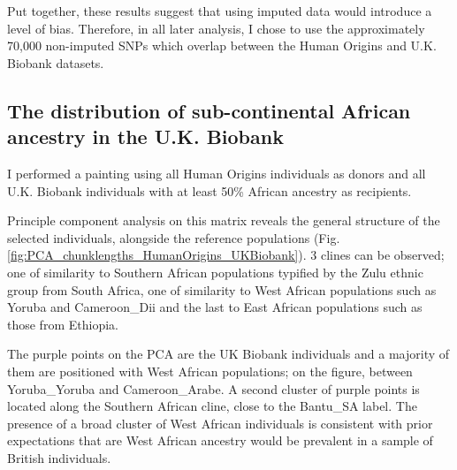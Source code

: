 Put together, these results suggest that using imputed data would introduce a level of bias. Therefore, in all later analysis, I chose to use the approximately 70,000 non-imputed SNPs which overlap between the Human Origins and U.K. Biobank datasets. 

\subsection{The distribution of sub-continental African ancestry in the U.K. Biobank}

I performed a painting using all Human Origins individuals as donors and all U.K. Biobank individuals with at least 50\% African ancestry as recipients. 

Principle component analysis on this matrix reveals the general structure of the selected individuals, alongside the reference populations (Fig. \ref{fig:PCA_chunklengths_HumanOrigins_UKBiobank}). 3 clines can be observed; one of similarity to Southern African populations typified by the Zulu ethnic group from South Africa, one of similarity to West African populations such as Yoruba and Cameroon\_Dii and the last to East African populations such as those from Ethiopia. 

The purple points on the PCA are the UK Biobank individuals and a majority of them are positioned with West African populations; on the figure, between Yoruba\_Yoruba and Cameroon\_Arabe. A second cluster of purple points is located along the Southern African cline, close to the Bantu\_SA label. The presence of a broad cluster of West African individuals is consistent with prior expectations that are West African ancestry would be prevalent in a sample of British individuals. 

